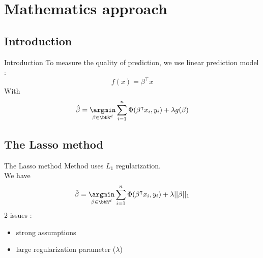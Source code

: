 \documentclass[unknownkeysallowed]{beamer}
\newcommand{\trans}[1]{{#1}^\intercal} %
\begin{document}
\section{Mathematics approach}
\label{sec:Mathematics approach}

\subsection*{Introduction}
\label{sub:Intro}
\begin{frame}{Introduction}
To measure the quality of prediction, we use linear prediction model :
\[f(x)=\trans{\beta}x\]
With \[\hat{\beta}=\underset{\beta \in \bbR^d}\argmin\sum_{i=1}^n \Phi(\trans{\beta}x_i, y_i)+\lambda g(\beta)\]
\end{frame}



\subsection{The Lasso method}
\label{sub:Lasso}

\begin{frame}{The Lasso method}
\vspace{0.4cm}
Method uses $L_1$ regularization.\\
We have \[\hat{\beta}=\underset{\beta \in \bbR^d}\argmin\sum_{i=1}^n \Phi(\trans{\beta}x_i, y_i)+\lambda ||\beta||_1\]
$2$ issues :
\begin{itemize}
    \item strong assumptions
    \item large regularization parameter ($\lambda$)
\end{itemize}
\end{frame}


\end{document}

